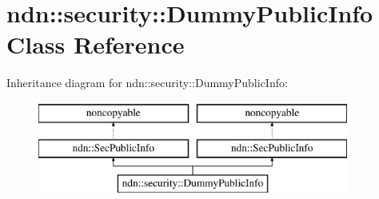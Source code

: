\hypertarget{classndn_1_1security_1_1DummyPublicInfo}{}\section{ndn\+:\+:security\+:\+:Dummy\+Public\+Info Class Reference}
\label{classndn_1_1security_1_1DummyPublicInfo}
Inheritance diagram for ndn\+:\+:security\+:\+:Dummy\+Public\+Info\+:\begin{figure}[H]
\begin{center}
\leavevmode
\includegraphics[height=3.000000cm]{classndn_1_1security_1_1DummyPublicInfo}
\end{center}
\end{figure}
